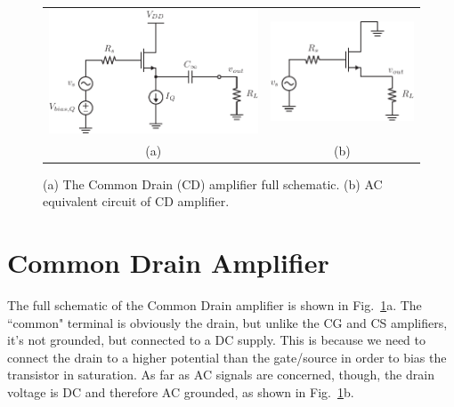 \begin{figure}[tb]
\begin{center}
\begin{tabular}{cc}
\includegraphics[scale=.9]{cd_amp_dc} &
\includegraphics[scale=.9]{cd_amp_ac} \\
(a) & (b) \\
\end{tabular}
\end{center}
\caption{(a) The Common Drain (CD) amplifier full schematic.  (b) AC equivalent circuit of CD amplifier.} \label{fig:cd_amp_dc_ac}
\end{figure}


\section{Common Drain Amplifier}


The full schematic of the Common Drain amplifier is shown in Fig.~\ref{fig:cd_amp_dc_ac}a.  The ``common" terminal is obviously the drain, but unlike the CG and CS amplifiers, it's not grounded, but connected to a DC supply.  This is because we need to connect the drain to a higher potential than the gate/source in order to bias the transistor in saturation.  As far as AC signals are concerned, though, the drain voltage is DC and therefore AC grounded, as shown in Fig.~\ref{fig:cd_amp_dc_ac}b.



